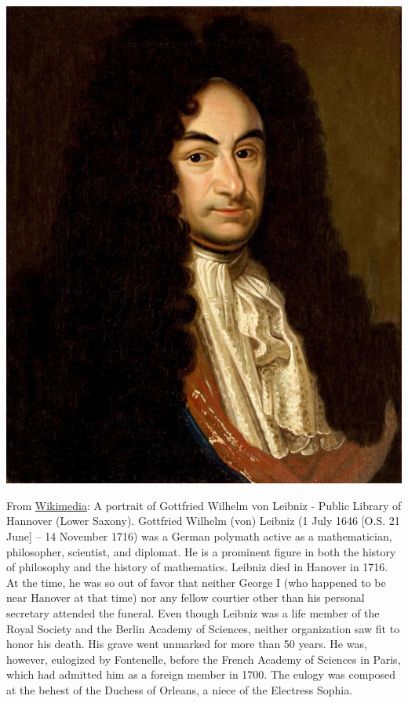 \documentclass[../main.tex]{subfiles}
\begin{document}
\begin{marginfigure}[-175mm]
	\includegraphics[width=1\linewidth]{images/Leibniz_Hannover.jpg}
	\caption[A portrait of Gottfried Wilhelm von Leibniz - Public Library of Hannover]{From \href{https://commons.wikimedia.org/wiki/File:Leibniz_Hannover.jpg}{Wikimedia}: A portrait of Gottfried Wilhelm von Leibniz - Public Library of Hannover (Lower Saxony). Gottfried Wilhelm (von) Leibniz (1 July 1646 [O.S. 21 June] – 14 November 1716) was a German polymath active as a mathematician, philosopher, scientist, and diplomat. He is a prominent figure in both the history of philosophy and the history of mathematics. Leibniz died in Hanover in 1716. At the time, he was so out of favor that neither George I (who happened to be near Hanover at that time) nor any fellow courtier other than his personal secretary attended the funeral. Even though Leibniz was a life member of the Royal Society and the Berlin Academy of Sciences, neither organization saw fit to honor his death. His grave went unmarked for more than 50 years. He was, however, eulogized by Fontenelle, before the French Academy of Sciences in Paris, which had admitted him as a foreign member in 1700. The eulogy was composed at the behest of the Duchess of Orleans, a niece of the Electress Sophia.}
\end{marginfigure}
\end{document}
